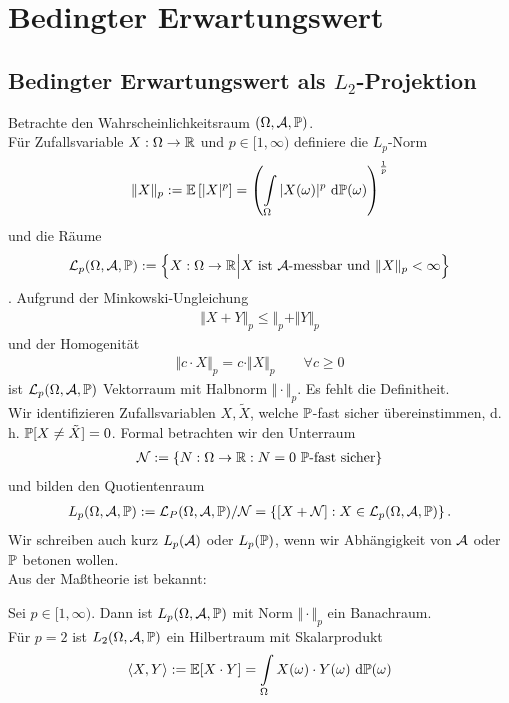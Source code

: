 \chapter{Bedingter Erwartungswert}
\section{Bedingter Erwartungswert als $L_2$-Projektion}
Betrachte den Wahrscheinlichkeitsraum $(\Omega,\A,\P)$.\\
Für Zufallsvariable $X:\Omega\to\R$ und $p\in[1,\infty)$ definiere die $L_p$-Norm
\begin{align*}
\Vert X\Vert_p:=\E\left[|X|^p\right]=\left(\int\limits_\Omega|X(\omega)|^p\d\P(\omega)\right)^{\frac{1}{p}}
\end{align*}
und die Räume
\begin{align*}
\mathcal{L}_p(\Omega,\A,\P):=\Big\lbrace X:\Omega\to\R\Big|X\text{ ist $\A$-messbar und }\Vert X\Vert_p<\infty\Big\rbrace
\end{align*}.
Aufgrund der Minkowski-Ungleichung
\begin{align*}
\Vert X+Y\Vert_p\leq\Vert_p+\Vert Y\Vert_p
\end{align*}
und der Homogenität
\begin{align*}
\Vert c\cdot X\Vert_p=c\cdot\Vert X\Vert_p\qquad\forall c\geq0
\end{align*}
ist $\mathcal{L}_p(\Omega,\A,\P)$ Vektorraum mit Halbnorm $\Vert\cdot\Vert_p$. Es fehlt die Definitheit.\\
Wir identifizieren Zufallsvariablen $X,\tilde{X}$, welche $\P$-fast sicher übereinstimmen, d. h. $\P[X\neq\tilde{X}]=0$. Formal betrachten wir den Unterraum
\begin{align*}
\mathcal{N}:=\lbrace N:\Omega\to\R:N=0\text{ $\P$-fast sicher}\rbrace
\end{align*}
und bilden den Quotientenraum
\begin{align*}
L_p(\Omega,\A,\P):=\mathcal{L}_P(\Omega,\A,\P)/\mathcal{N}=\left\lbrace[X+\mathcal{N}]:X\in\mathcal{L}_p(\Omega,\A,\P)\right\rbrace.
\end{align*}
Wir schreiben auch kurz $L_p(\A)$ oder $L_p(\P)$, wenn wir Abhängigkeit von $\A$ oder $\P$ betonen wollen.\\
Aus der Maßtheorie ist bekannt:

\begin{theorem}
Sei $p\in[1,\infty)$. Dann ist $L_p(\Omega,\A,\P)$ mit Norm $\Vert\cdot\Vert_p$ ein Banachraum.\\
Für $p=2$ ist $L_2(\Omega,\A,\P)$ ein Hilbertraum mit Skalarprodukt
\begin{align*}
\langle X,Y\rangle:=\E[X\cdot Y]=\int\limits_\Omega X(\omega)\cdot Y(\omega)\d\P(\omega)
\end{align*}
\end{theorem}

